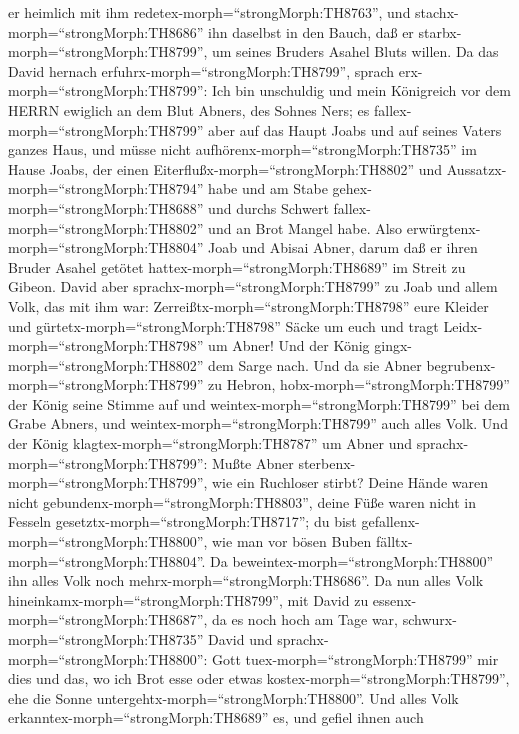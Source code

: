 er heimlich mit ihm redetex-morph=``strongMorph:TH8763'', und
stachx-morph=``strongMorph:TH8686'' ihn daselbst in den Bauch, daß er
starbx-morph=``strongMorph:TH8799'', um seines Bruders Asahel Bluts
willen.  Da das David hernach
erfuhrx-morph=``strongMorph:TH8799'', sprach
erx-morph=``strongMorph:TH8799'': Ich bin unschuldig und mein Königreich
vor dem HERRN ewiglich an dem Blut Abners, des Sohnes Ners;
 es fallex-morph=``strongMorph:TH8799'' aber auf das Haupt
Joabs und auf seines Vaters ganzes Haus, und müsse nicht
aufhörenx-morph=``strongMorph:TH8735'' im Hause Joabs, der einen
Eiterflußx-morph=``strongMorph:TH8802'' und
Aussatzx-morph=``strongMorph:TH8794'' habe und am Stabe
gehex-morph=``strongMorph:TH8688'' und durchs Schwert
fallex-morph=``strongMorph:TH8802'' und an Brot Mangel habe.
 Also erwürgtenx-morph=``strongMorph:TH8804'' Joab und
Abisai Abner, darum daß er ihren Bruder Asahel getötet
hattex-morph=``strongMorph:TH8689'' im Streit zu Gibeon. 
David aber sprachx-morph=``strongMorph:TH8799'' zu Joab und allem Volk,
das mit ihm war: Zerreißtx-morph=``strongMorph:TH8798'' eure Kleider und
gürtetx-morph=``strongMorph:TH8798'' Säcke um euch und tragt
Leidx-morph=``strongMorph:TH8798'' um Abner! Und der König
gingx-morph=``strongMorph:TH8802'' dem Sarge nach.  Und da
sie Abner begrubenx-morph=``strongMorph:TH8799'' zu Hebron,
hobx-morph=``strongMorph:TH8799'' der König seine Stimme auf und
weintex-morph=``strongMorph:TH8799'' bei dem Grabe Abners, und
weintex-morph=``strongMorph:TH8799'' auch alles Volk.  Und
der König klagtex-morph=``strongMorph:TH8787'' um Abner und
sprachx-morph=``strongMorph:TH8799'': Mußte Abner
sterbenx-morph=``strongMorph:TH8799'', wie ein Ruchloser stirbt?
 Deine Hände waren nicht
gebundenx-morph=``strongMorph:TH8803'', deine Füße waren nicht in
Fesseln gesetztx-morph=``strongMorph:TH8717''; du bist
gefallenx-morph=``strongMorph:TH8800'', wie man vor bösen Buben
fälltx-morph=``strongMorph:TH8804''. Da
beweintex-morph=``strongMorph:TH8800'' ihn alles Volk noch
mehrx-morph=``strongMorph:TH8686''.  Da nun alles Volk
hineinkamx-morph=``strongMorph:TH8799'', mit David zu
essenx-morph=``strongMorph:TH8687'', da es noch hoch am Tage war,
schwurx-morph=``strongMorph:TH8735'' David und
sprachx-morph=``strongMorph:TH8800'': Gott
tuex-morph=``strongMorph:TH8799'' mir dies und das, wo ich Brot esse
oder etwas kostex-morph=``strongMorph:TH8799'', ehe die Sonne
untergehtx-morph=``strongMorph:TH8800''.  Und alles Volk
erkanntex-morph=``strongMorph:TH8689'' es, und gefiel ihnen auch
